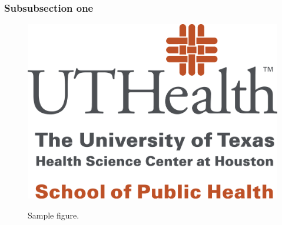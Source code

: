 \documentclass[12pt]{article}
\begin{document}
\subsubsection{Subsubsection one}\label{sec:subsimulation2-1}

\begin{figure}[H]
\centering
\includegraphics[scale=0.5]{SPH_2c_vert+below_lrg}
\label{fig: sample}
\caption{Sample figure.}
\end{figure}
















\end{document}
